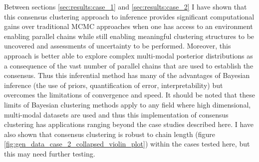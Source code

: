 \documentclass[14pt]{extarticle} %
\begin{document}
	
	Between sections \ref{sec:results:case_1} and \ref{sec:results:case_2} I have shown that this consensus clustering approach to inference provides significant computational gains over traditional MCMC approaches when one has access to an environment enabling parallel chains while still enabling meaningful clustering structures to be uncovered and assessments of uncertainty to be performed. Moreover, this approach is better able to explore complex multi-modal posterior distributions as a consequence of the vast number of parallel chains that are used to establish the consensus. Thus this inferential method has many of the advantages of Bayesian inference (the use of priors, quantification of error, interpretability) but overcomes the limitations of convergence and speed. It should be noted that these limits of Bayesian clustering methods apply to any field where high dimensional, multi-modal datasets are used and thus this implementation of consensus clustering has applications ranging beyond the case studies described here. I have also shown that consensus clustering is robust to chain length (figure \ref{fig:gen_data_case_2_collapsed_violin_plot}) within the cases tested here, but this may need further testing.
	
\end{document}
